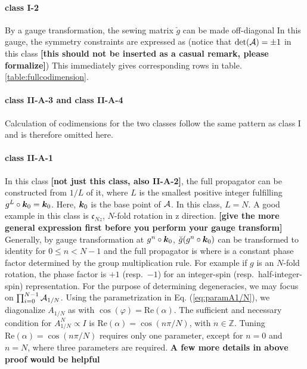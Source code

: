 \documentclass[aps, prb, showpacs, twocolumn, notitlepage, superscriptaddress]{revtex4-1}
\begin{document}
\paragraph*{class I-2}
By a gauge transformation, the sewing matrix $\breve{g}$ can be made off-diagonal
In this gauge, the symmetry constraints are expressed as (notice that $\det({\cal A})=\pm 1$ in this class \textbf{[this should not be inserted as a casual remark, please formalize]})
This immediately gives corresponding rows in table. \ref{table:fullcodimension}.

\paragraph*{class II-A-3 and class II-A-4} Calculation of codimensions for the two classes follow the same pattern as class I and is therefore omitted here.

\paragraph*{class II-A-1} In this class \textbf{[not just this class, also II-A-2]}, the full propagator can be constructed from $1/L$ of it, where $L$ is the smallest positive integer fulfilling $g^L\circ \boldsymbol{k}_0=\boldsymbol{k}_0$. Here, $\boldsymbol{k}_0$ is the base point of ${\cal A}$. In this class, $L=N$. A good example in this class is $\mathfrak{c}_{Nz}$, $N$-fold rotation in z direction.\textbf{ [give the more general expression first before you perform your gauge transform]} Generally, by gauge transformation at $g^n\circ \boldsymbol{k}_0$, $\breve{g}(g^n\circ \boldsymbol{k}_0)$ can be transformed to identity for $0 \le n < N-1$ and the full propagator is
where 
is a constant phase factor determined by the group multiplication rule. For example if $g$ is an $N$-fold rotation,  the phase factor is $+1$ (resp.\ $-1$) for an integer-spin (resp.\ half-integer-spin) representation. For the purpose of determining degeneracies, we may focus on
$\prod_{i=0}^{N-1} {\cal A}_{1/N}$. Using the parametrization in Eq. (\ref{eq:paramA1/N}), we diagonalize $A_{1/N}$ as 
with $\cos(\varphi)=\text{Re}(\alpha)$. The sufficient and necessary condition for $A_{1/N}^N \propto I$ is $\text{Re}(\alpha)=\cos(n\pi/N)$, with $n\in\mathbb{Z}$. Tuning $\text{Re}(\alpha)=\cos(n\pi/N)$ requires only one parameter, except for $n=0$ and $n=N$, where three parameters are required. \textbf{A few more details in above proof would be helpful}
\end{document}
